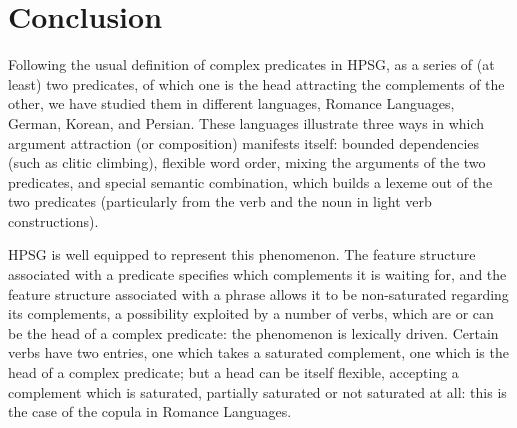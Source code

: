 \documentclass[output=paper
                ,modfonts
                ,nonflat
	        ,collection
	        ,collectionchapter
	        ,collectiontoclongg
 	        ,biblatex
                ,babelshorthands
                ,newtxmath
                ,draftmode
                ,colorlinks, citecolor=brown
]{./langsci/langscibook}
\begin{document}
{\begin{exe}
\end{exe}

\section{Conclusion}\label{GSsection6}

Following the usual definition of complex predicates in HPSG, as a series of (at least) two predicates, of which one is the head attracting the complements of the other, we have studied them in different languages, Romance Languages, German, Korean, and Persian. These languages illustrate three ways in which argument attraction (or composition) manifests itself: bounded dependencies (such as clitic climbing), flexible word order, mixing the arguments of the two predicates, and special semantic combination, which builds a lexeme out of the two predicates (particularly from the verb and the noun in light verb constructions). 

HPSG is well equipped to represent this phenomenon. The feature structure associated with a predicate specifies which complements it is waiting for, and the feature structure associated with a phrase allows it to be non-saturated regarding its complements, a possibility exploited by a number of verbs, which are or can be the head of a complex predicate: the phenomenon is lexically driven. Certain verbs have two entries, one which takes a saturated complement, one which is the head of a complex predicate; but a head can be itself flexible, accepting a complement which is saturated, partially saturated or not saturated at all: this is the case of the copula in Romance Languages.

}
\end{document}
